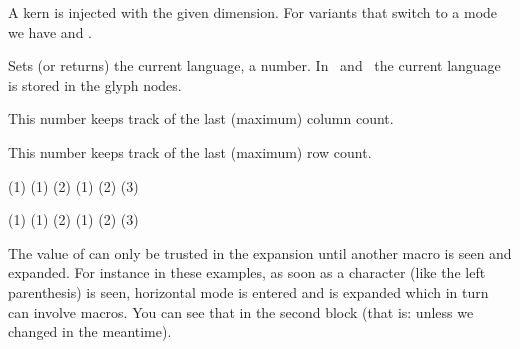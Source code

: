 \stopnewprimitive

\startoldprimitive[title={\prm {kern}}]

A kern is injected with the given dimension. For variants that switch to a mode
we have  and .

\stopoldprimitive

\startoldprimitive[title={\prm {language}}]

Sets (or returns) the current language, a number. In \LUATEX\ and \LUAMETATEX\
the current language is stored in the glyph nodes.

\stopoldprimitive

\startnewprimitive[title={\prm {lastalignmentcolumn}}]

This number keeps track of the last (maximum) column count.

\stopnewprimitive

\startnewprimitive[title={\prm {lastalignmentrow}}]

This number keeps track of the last (maximum) row count.

\stopnewprimitive

\startnewprimitive[title={\prm {lastarguments}}]

\startbuffer
\def\MyMacro    #1{\the\lastarguments (#1) }          \MyMacro{1}       \crlf
\def\MyMacro  #1#2{\the\lastarguments (#1) (#2)}      \MyMacro{1}{2}    \crlf
\def\MyMacro#1#2#3{\the\lastarguments (#1) (#2) (#3)} \MyMacro{1}{2}{3} \par

\def\MyMacro    #1{(#1)           \the\lastarguments} \MyMacro{1}       \crlf
\def\MyMacro  #1#2{(#1) (#2)      \the\lastarguments} \MyMacro{1}{2}    \crlf
\def\MyMacro#1#2#3{(#1) (#2) (#3) \the\lastarguments} \MyMacro{1}{2}{3} \par
\stopbuffer

\typebuffer

The value of  can only be trusted in the expansion until
another macro is seen and expanded. For instance in these examples, as soon as a
character (like the left parenthesis) is seen, horizontal mode is entered and
 is expanded which in turn can involve macros. You can see that
in the second block (that is: unless we changed \prm {everypar} in the
meantime).

{\getbuffer}

\stopnewprimitive

\startnewprimitive[title={\prm {lastatomclass}}]

